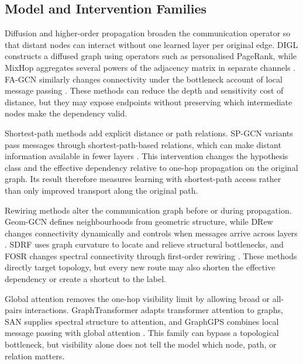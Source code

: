 \subsection{Model and Intervention Families}

Diffusion and higher-order propagation broaden the communication operator so that distant nodes can interact without one learned layer per original edge.
DIGL constructs a diffused graph using operators such as personalised PageRank, while MixHop aggregates several powers of the adjacency matrix in separate channels \cite{gasteiger2019diffusion,abu2019mixhop}.
FA-GCN similarly changes connectivity under the bottleneck account of local message passing \cite{alon2021bottleneck,zhou2025glora}.
These methods can reduce the depth and sensitivity cost of distance, but they may expose endpoints without preserving which intermediate nodes make the dependency valid.

Shortest-path methods add explicit distance or path relations.
SP-GCN variants pass messages through shortest-path-based relations, which can make distant information available in fewer layers \cite{abboud2022shortest}.
This intervention changes the hypothesis class and the effective dependency relative to one-hop propagation on the original graph.
Its result therefore measures learning with shortest-path access rather than only improved transport along the original path.

Rewiring methods alter the communication graph before or during propagation.
Geom-GCN defines neighbourhoods from geometric structure, while DRew changes connectivity dynamically and controls when messages arrive across layers \cite{pei2020geomgcn,gutteridge2023drew}.
SDRF uses graph curvature to locate and relieve structural bottlenecks, and FOSR changes spectral connectivity through first-order rewiring \cite{topping2022curvature,karhadkar2023fosr}.
These methods directly target topology, but every new route may also shorten the effective dependency or create a shortcut to the label.

Global attention removes the one-hop visibility limit by allowing broad or all-pairs interactions.
GraphTransformer adapts transformer attention to graphs, SAN supplies spectral structure to attention, and GraphGPS combines local message passing with global attention \cite{vaswani2017attention,dwivedi2020graphtransformer,kreuzer2021san,rampasek2022gps}.
This family can bypass a topological bottleneck, but visibility alone does not tell the model which node, path, or relation matters.

